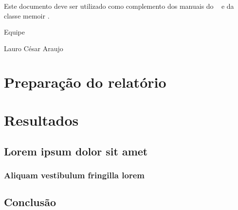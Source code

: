 \documentclass[
	12pt,				%
	oneside,            %
	a4paper,			%
	english,			%
	french,				%
	spanish,			%
	brazil,				%
	]{abntex2}
\begin{document}
Este documento deve ser utilizado como complemento dos manuais do \abnTeX\ 
\cite{abntex2classe,abntex2cite,abntex2cite-alf} e da classe \textsf{memoir}
\cite{memoir}. 

Equipe \abnTeX 

Lauro César Araujo


\part{Preparação do relatório}





\part{Resultados}

\chapter{Lorem ipsum dolor sit amet}

\section{Aliquam vestibulum fringilla lorem}

\lipsum[1]

\lipsum[2-3]


\chapter{Conclusão}

\lipsum[31-33]

\postextual
\end{document}
